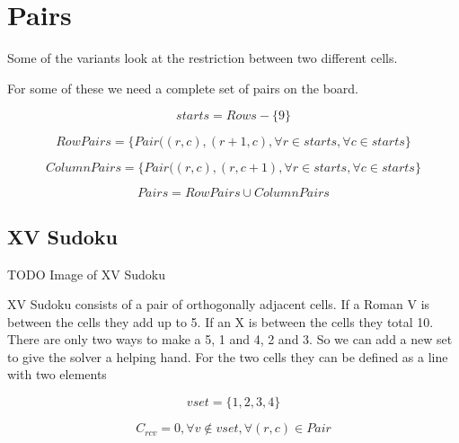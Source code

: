 \documentclass{article}
\begin{document}

\section{Pairs}

Some of the variants look at the restriction between two different cells. 

For some of these we need a complete set of pairs on the board.


\begin{equation}
starts = Rows - \lbrace 9 \rbrace
\end{equation}

\begin{equation}
RowPairs = \lbrace  Pair ((r,c), (r+1, c), \forall r \in starts, \forall c \in starts \rbrace
\end{equation}

\begin{equation}
ColumnPairs = \lbrace  Pair ((r,c), (r, c+1), \forall r \in starts, \forall c \in starts \rbrace
\end{equation}

\begin{equation}
Pairs = RowPairs \cup ColumnPairs
\end{equation}


\subsection {XV Sudoku}

TODO Image of XV Sudoku

XV Sudoku consists of a pair of orthogonally adjacent cells. If a Roman V is between the cells they add up to 5.
If an X is between the cells they total 10.  There are only two ways to make a 5, 1 and 4, 2 and 3. So we can add a new set to give the solver a helping hand.
For the two cells they can be defined as a line with two elements

\begin{equation}
vset=\lbrace 1,2,3,4 \rbrace
\end{equation}


\begin{equation}
C_{rcv} = 0, \forall v \notin vset, \forall (r,c) \in Pair
\end{equation}
\end{document}
